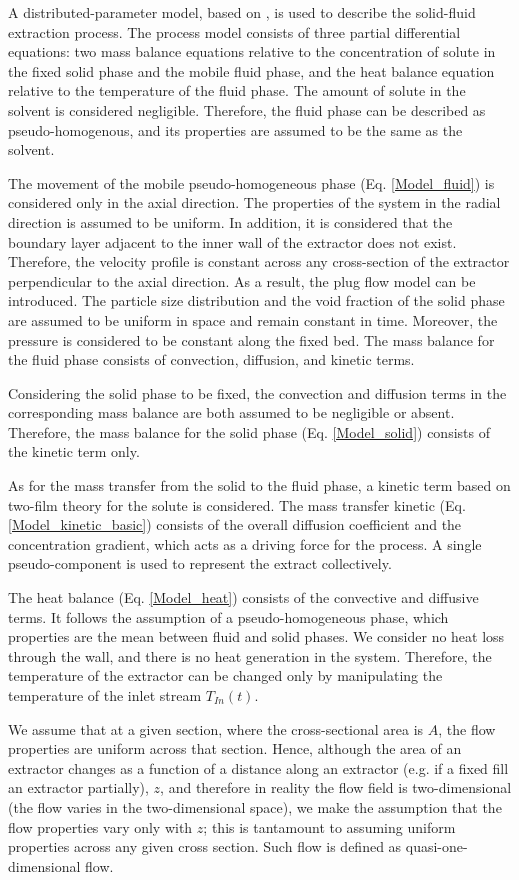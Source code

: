 \documentclass[../Parameter_fitting.tex]{subfiles}
\begin{document}
	{\color{blue}A distributed-parameter model, based on \citet{Reverchon1996}, is used to describe the solid-fluid extraction process. The process model consists of three partial differential equations: two mass balance equations relative to the concentration of solute in the fixed solid phase and the mobile fluid phase, and the heat balance equation relative to the temperature of the fluid phase. The amount of solute in the solvent is considered negligible. Therefore, the fluid phase can be described as pseudo-homogenous, and its properties are assumed to be the same as the solvent.
		
		The movement of the mobile pseudo-homogeneous phase (Eq. \ref{Model_fluid}) is considered only in the axial direction. The properties of the system in the radial direction is assumed to be uniform. In addition, it is considered that the boundary layer adjacent to the inner wall of the extractor does not exist. Therefore, the velocity profile is constant across any cross-section of the extractor perpendicular to the axial direction. As a result, the plug flow model can be introduced. The particle size distribution and the void fraction of the solid phase are assumed to be uniform in space and remain constant in time. Moreover, the pressure is considered to be constant along the fixed bed. The mass balance for the fluid phase consists of convection, diffusion, and kinetic terms.
		
		Considering the solid phase to be fixed, the convection and diffusion terms in the corresponding mass balance are both assumed to be negligible or absent. Therefore, the mass balance for the solid phase (Eq. \ref{Model_solid}) consists of the kinetic term only. 
		
		As for the mass transfer from the solid to the fluid phase, a kinetic term based on two-film theory for the solute is considered. The mass transfer kinetic (Eq. \ref{Model_kinetic_basic}) consists of the overall diffusion coefficient and the concentration gradient, which acts as a driving force for the process. A single pseudo-component is used to represent the extract collectively.
		
		The heat balance (Eq. \ref{Model_heat}) consists of the convective and diffusive terms. It follows the assumption of a pseudo-homogeneous phase, which properties are the mean between fluid and solid phases. We consider no heat loss through the wall, and there is no heat generation in the system. Therefore, the temperature of the extractor can be changed only by manipulating the temperature of the inlet stream $T_{In}(t)$.
		
		We assume that at a given section, where the cross-sectional area is $A$, the flow properties are uniform across that section. Hence, although the area of an extractor changes  as a function of a distance along an extractor (e.g. if a fixed fill an extractor partially), $z$, and therefore in reality the flow field is two-dimensional (the flow varies in the two-dimensional space), we make the assumption that the flow properties vary only with $z$; this is tantamount to assuming uniform properties across any given cross section. Such flow is defined as quasi-one-dimensional flow.
		
	}
	
\end{document}
